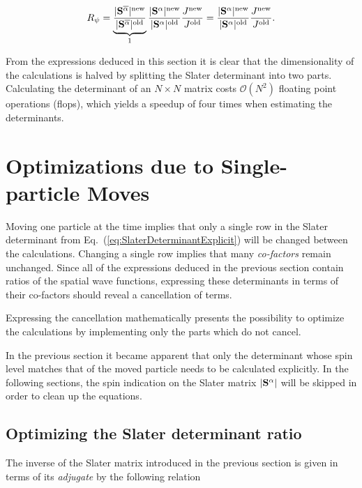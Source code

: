 \begin{equation}
 R_\psi = \underbrace{\frac{|\mathbf{S}^{\overline{\alpha}}|^\mathrm{new}}{|\mathbf{S}^{\overline{\alpha}}|^\mathrm{old}}}_{1}\frac{|\mathbf{S}^{\alpha}|^\mathrm{new}}{|\mathbf{S}^{\alpha}|^\mathrm{old}}\frac{J^\mathrm{new}}{J^\mathrm{old}} = \frac{|\mathbf{S}^{\alpha}|^\mathrm{new}}{|\mathbf{S}^{\alpha}|^\mathrm{old}}\frac{J^\mathrm{new}}{J^\mathrm{old}}. \label{eq:RpsiOpt}
\end{equation}

From the expressions deduced in this section it is clear that the dimensionality of the calculations is halved by splitting the Slater determinant into two parts. Calculating the determinant of an $N\times N$ matrix costs $\mathcal{O}(N^2)$ floating point operations (flops), which yields a speedup of four times when estimating the determinants. 

\section{Optimizations due to Single-particle Moves}

Moving one particle at the time implies that only a single row in the Slater determinant from Eq.~(\ref{eq:SlaterDeterminantExplicit}) will be changed between the calculations. Changing a single row implies that many \textit{co-factors} remain unchanged. Since all of the expressions deduced in the previous section contain ratios of the spatial wave functions, expressing these determinants in terms of their co-factors should reveal a cancellation of terms. 

Expressing the cancellation mathematically presents the possibility to optimize the calculations by implementing only the parts which do not cancel. 

In the previous section it became apparent that only the determinant whose spin level matches that of the moved particle needs to be calculated explicitly. In the following sections, the spin indication on the Slater matrix $|\mathbf{S}^{\alpha}|$ will be skipped in order to clean up the equations.

\subsection{Optimizing the Slater determinant ratio}
\label{sec:optSlaterRat}

\newcommand{\Sinv}{\mathbf{S}^{-1}}

The inverse of the Slater matrix introduced in the previous section is given in terms of its \textit{adjugate} by the following relation \cite{linAlg}

